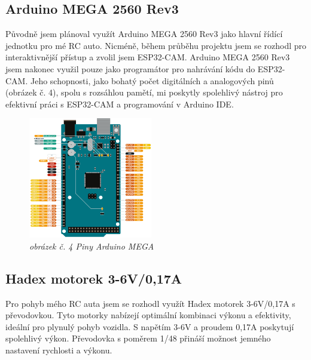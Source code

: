 \documentclass[12pt, a4paper,
oneside,      %
openany
]{report}
\begin{document}
\subsection{Arduino MEGA 2560 Rev3}
\noindent Původně jsem plánoval využít Arduino MEGA 2560 Rev3 jako hlavní řídící jednotku pro mé RC auto. Nicméně, během průběhu projektu jsem se rozhodl pro interaktivnější přístup a zvolil jsem ESP32-CAM. Arduino MEGA 2560 Rev3 jsem nakonec využil pouze jako programátor pro nahrávání kódu do ESP32-CAM. Jeho schopnosti, jako bohatý počet digitálních a analogových pinů (obrázek č. 4), spolu s rozsáhlou pamětí, mi poskytly spolehlivý nástroj pro efektivní práci s ESP32-CAM a programování v Arduino IDE.
\begin{figure}[H]
        \centering
		\includegraphics[width=0.48\textwidth]{image/arduionoPins.png}
        \caption*{\textit{obrázek č. 4 Piny Arduino MEGA }}
        \label{fig:arduino}
    \end{figure}

\subsection{Hadex motorek 3-6V/0,17A}
\noindent Pro pohyb mého RC auta jsem se rozhodl využít Hadex motorek 3-6V/0,17A s převodovkou. Tyto motorky nabízejí optimální kombinaci výkonu a efektivity, ideální pro plynulý pohyb vozidla. S napětím 3-6V a proudem 0,17A poskytují spolehlivý výkon. Převodovka s poměrem 1/48 přináší možnost jemného nastavení rychlosti a výkonu.
\end{document}
